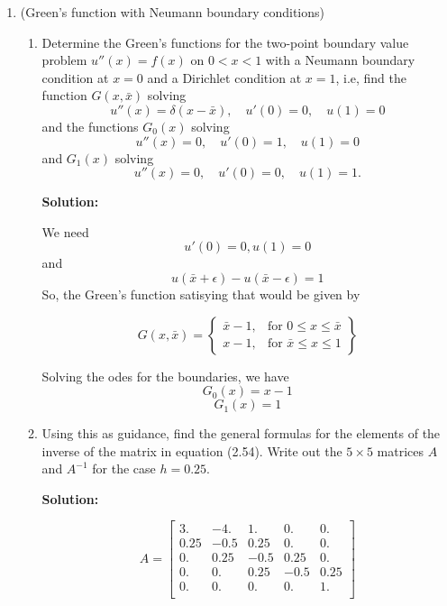\documentclass[letterpaper,12pt]{article}
\begin{document}
\begin{enumerate}
\begin{enumerate}
{\bf Solution:}

\[u(x) = \int_0^1 f( \bar{x} ) G(x; \bar{x} )\,d \bar{x}\]
Setting x = $x_i$ and using the Trapezoidal approximation,
\[u_i =   h \frac{ f( 0 ) G( x_i ; 0 )}{2} + h \sum_{j=1}^m f( x_j ) G( x_i ; x_j )+  h \frac{ f( 1 ) G( x_i ; 1 )}{2} \]
Since the Green's function is the solution to the ODE and since at the boundaries, u is 0, G(x,0)=G(x,1)=0.
So, we get
\[u_i = h \sum_{j=1}^m f( x_j ) G( x_i ; x_j )\]
\end{enumerate}

\item (Green's function with Neumann boundary conditions)
\begin{enumerate}
\item
Determine the Green's functions for the two-point boundary
value problem $u''(x) = f(x)$ on $0<x<1$ with a Neumann boundary condition
at $x=0$ and a Dirichlet condition at $x=1$, i.e, find the function
$G(x,\bar x)$ solving
\[
u''(x) = \delta(x-\bar x), \quad u'(0)=0, \quad u(1)=0
\]
and the functions $G_0(x)$ solving
\[
u''(x) = 0, \quad u'(0)=1, \quad u(1)=0
\]
and $G_1(x)$ solving
\[
u''(x) = 0, \quad u'(0)=0, \quad u(1)=1.
\]


{\bf Solution:}

 We need 
 \[u'(0)=0 , u(1)=0 \]
 and
 \[u(\bar{x}+\epsilon)-u(\bar{x}-\epsilon)=1\]
 So, the Green's function satisying that would be given by

  \[
    G(x,\bar{x}) = \left\{\begin{array}{lr}
        \bar{x}-1, & \text{for } 0\leq x\leq \bar{x}\\

        x-1, & \text{for } \bar{x}\leq x\leq 1
        \end{array}\right\} \]

Solving the odes for the boundaries, we have
\[G_0(x) = x-1\]
\[G_1(x) = 1\]
\item
Using this as guidance, find the general formulas for the elements of the
inverse of the matrix in equation (2.54).  Write out the $5\times 5$ matrices
$A$ and $A^{-1}$ for the case $h=0.25$.

{\bf Solution:}


\[A = \begin{bmatrix}
        3. & -4. & 1. & 0. & 0.\\
        0.25 & -0.5 & 0.25 & 0. & 0.\\ 
        0. & 0.25 & -0.5 & 0.25 & 0.\\ 
        0. & 0. & 0.25 & -0.5 & 0.25\\ 
        0. & 0. & 0. & 0. & 1.\\
        \end{bmatrix} \]
        

\end{enumerate}
\end{enumerate}
\end{document}
